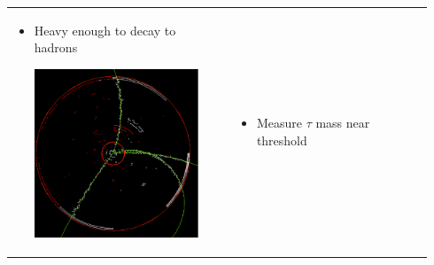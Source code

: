\begin{slide*}
\slideframe{}
\begin{minipage}[t]{\linewidth}
\large

\vspace{0.2 cm}

\hspace{-0.6 cm} \begin{tabular}{p{0.47\linewidth} c p{0.47\linewidth}}
  \begin{minipage}{\linewidth}
    \begin{itemize}
      \item Heavy enough to decay to hadrons
	\begin{center}
	  \includegraphics[width=\linewidth]{tau_event.eps}
	\end{center}
    \end{itemize}
  \end{minipage} & &
  \begin{minipage}{\linewidth}
    \begin{itemize}
      \item Measure $\tau$ mass near threshold
	\begin{center}

\end{center}
\end{itemize}
\end{minipage}
\end{tabular}
\end{minipage}
\end{slide*}
